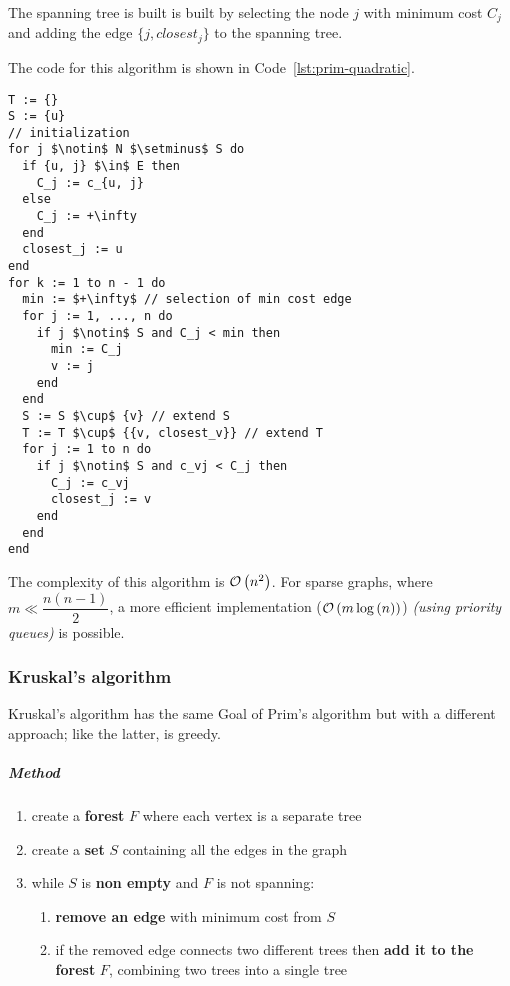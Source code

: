 \documentclass[english]{article}
\begin{document}
The spanning tree is built is built by selecting the node \(j\) with minimum cost \(C_j\) and adding the edge \(\{j, \textit{closest}_j\}\) to the spanning tree.

\bigskip
The code for this algorithm is shown in Code~\ref{lst:prim-quadratic}.

\begin{lstlisting}[caption={Prim's algorithm in quadratic time}, label={lst:prim-quadratic}, float]
T := {}
S := {u}
// initialization
for j $\notin$ N $\setminus$ S do
  if {u, j} $\in$ E then
    C_j := c_{u, j}
  else
    C_j := +\infty
  end
  closest_j := u
end
for k := 1 to n - 1 do
  min := $+\infty$ // selection of min cost edge
  for j := 1, ..., n do
    if j $\notin$ S and C_j < min then
      min := C_j
      v := j
    end
  end
  S := S $\cup$ {v} // extend S
  T := T $\cup$ {{v, closest_v}} // extend T
  for j := 1 to n do
    if j $\notin$ S and c_vj < C_j then
      C_j := c_vj
      closest_j := v
    end
  end
end
\end{lstlisting}

\bigskip
The complexity of this algorithm is \(\mathcal{O}\left(n^2\right)\).
For sparse graphs, where \(m \ll \dfrac{n(n-1)}{2}\), a more efficient implementation (\(\mathcal{O}\left(m \log{(n)}\right)\)) \textit{(using priority queues)} is possible.

\subsubsection{Kruskal's algorithm}

Kruskal's algorithm has the same Goal of Prim's algorithm but with a different approach;
like the latter, is greedy.

\subparagraph*{Method}

\begin{enumerate}
  \item create a \textbf{forest} \(F\) where each vertex is a separate tree
  \item create a \textbf{set} \(S\) containing all the edges in the graph
  \item while \(S\) is \textbf{non empty }and \(F\) is not spanning:
        \begin{enumerate}
          \item \textbf{remove an edge} with minimum cost from \(S\)
          \item if the removed edge connects two different trees then \textbf{add it to the forest} \(F\), combining two trees into a single tree
        \end{enumerate}
\end{enumerate}
\end{document}
